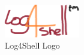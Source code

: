 
\begin{figure}
    \begin{center}
        \includegraphics[width=0.3\textwidth]{images/log4shell-logo}
    \end{center}
    \caption{Log4Shell Logo}
\end{figure}
